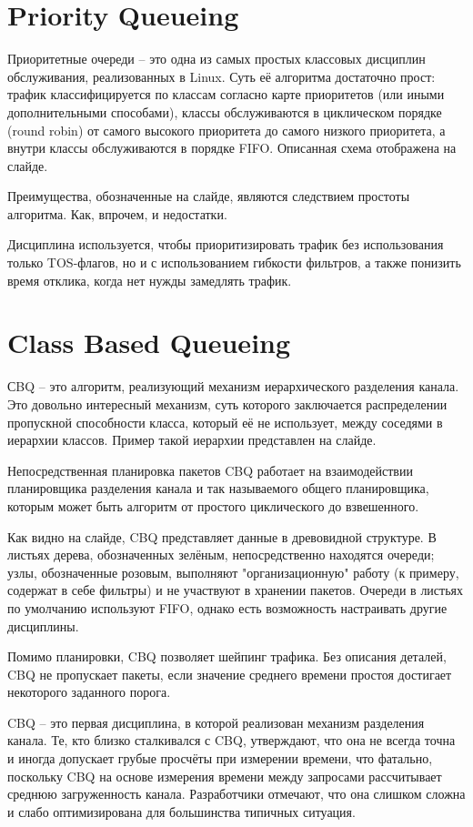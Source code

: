 \documentclass[12pt]{ncc}
\begin{document}
	\section{Priority Queueing}

	Приоритетные очереди -- это одна из самых простых классовых
	дисциплин обслуживания, реализованных в Linux. Суть её алгоритма
	достаточно прост: трафик классифицируется по классам согласно 
	карте приоритетов (или иными дополнительными способами),
	классы обслуживаются в циклическом порядке (round robin)
	от самого высокого приоритета до самого низкого приоритета,
	а внутри классы обслуживаются в порядке FIFO. Описанная схема
	отображена на слайде.

	Преимущества, обозначенные на слайде, являются следствием
	простоты алгоритма. Как, впрочем, и недостатки. 

	Дисциплина используется, чтобы приоритизировать трафик без
	использования только TOS-флагов, но и с использованием
	гибкости фильтров, а также понизить время отклика, когда
	нет нужды замедлять трафик.

	\section{Class Based Queueing}

	СBQ -- это алгоритм, реализующий механизм иерархического разделения
	канала. Это довольно интересный механизм, суть которого заключается
	распределении пропускной способности класса, который её не использует,
	между соседями в иерархии классов. Пример такой иерархии представлен
	на слайде. 

	Непосредственная планировка пакетов CBQ работает на взаимодействии
	планировщика разделения канала и так называемого общего планировщика,
	которым может быть алгоритм от простого циклического до взвешенного.
	
	Как видно на слайде, CBQ представляет данные в древовидной структуре.
    В листьях дерева, обозначенных зелёным,  непосредственно находятся
	 очереди; узлы, обозначенные розовым,  выполняют
	"организационную" работу (к примеру, содержат в себе фильтры) и не
	участвуют в хранении пакетов. Очереди в листьях по умолчанию
	используют FIFO, однако есть возможность настраивать другие дисциплины.

	Помимо планировки, CBQ позволяет шейпинг трафика. Без описания деталей,
	CBQ не пропускает пакеты, если значение среднего времени простоя
 	достигает некоторого заданного порога.

	CBQ -- это первая дисциплина, в которой реализован механизм разделения
	канала. Те, кто близко сталкивался с CBQ, утверждают,
	что она не всегда точна и иногда допускает грубые просчёты при
	измерении времени, что фатально, поскольку CBQ на основе измерения
	времени между запросами рассчитывает среднюю загруженность канала.
	Разработчики отмечают, что она слишком сложна и слабо оптимизирована
	для большинства типичных ситуация.
\end{document}
